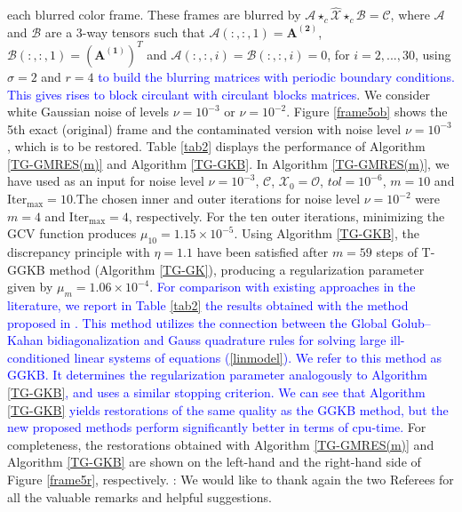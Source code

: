 \documentclass{siamltex}
\newcommand{\1}{\mathbb{1}}
\newcommand{\0}{\mathbb{0}}
\begin{document}
	each blurred color frame. These frames are blurred by $\mathscr {A}\star_c \widehat{\mathscr{X}}\star_c \mathscr{B}= \widehat{\mathscr{C}}$, where  $\mathscr {A}$ and $\mathscr {B}$  are a 3-way tensors such that  $\mathscr {A}(:,:,1)= \mathbf{A^{(2)}}$, $\mathscr {B}(:,:,1)= (\mathbf{A^{(1)}})^T$ and $\mathscr {A}(:,:,i)=\mathscr {B}(:,:,i)=0$, for $i=2,...,30$,  using $\sigma=2$ and $r=4$ \textcolor{blue}{to build the blurring matrices with periodic boundary conditions. This gives rises to block circulant with circulant blocks matrices}. We consider white Gaussian noise of levels $\nu=10^{-3}$ or $\nu=10^{-2}$. Figure \ref{frame5ob} shows the 5th exact (original) frame and the contaminated version with noise level $\nu=10^{-3}$, which is to be restored. Table \ref{tab2} displays the performance of Algorithm \ref{TG-GMRES(m)} and Algorithm \ref{TG-GKB}. In Algorithm \ref{TG-GMRES(m)}, we have used as an input for noise level $\nu=10^{-3}$,  $\mathscr{C}$, $\mathscr{X}_0=\mathscr{O}$, $tol=10^{-6}$, $m=10$ and $\text{Iter}_{\text{max}}=10$.The chosen inner and outer iterations for noise level $\nu=10^{-2}$ were $m=4$ and  $\text{Iter}_{\text{max}}=4$, respectively. For the ten outer iterations,  minimizing the GCV function  produces  $\mu_{10}=1.15 \times 10^{-5}$. Using Algorithm \ref{TG-GKB},  the discrepancy principle with $\eta=1.1$ have been satisfied after $m=59$ steps of  T-GGKB method (Algorithm \ref{TG-GK}), producing a regularization parameter given by $\mu_m=1.06\times10^{-4}$. \textcolor{blue}{For comparison with existing approaches in the literature, we report in Table \ref{tab2} the results obtained with the method 
		proposed in \cite{belguide2}. This method utilizes the connection between the
		Global Golub--Kahan bidiagonalization and Gauss quadrature rules for solving large 
		ill-conditioned linear systems of equations (\ref{linmodel}). We refer to this method as
		GGKB. It determines the regularization parameter analogously to Algorithm \ref{TG-GKB}, and uses a similar stopping criterion. We can see that Algorithm \ref{TG-GKB} yields restorations of the same quality as the GGKB method, but the new proposed methods perform significantly better in terms of cpu-time.} For completeness, the restorations obtained with Algorithm \ref{TG-GMRES(m)} and Algorithm \ref{TG-GKB} are shown on the left-hand and the right-hand side of Figure \ref{frame5r}, respectively.
:  
 We would like to thank again the two Referees for all the valuable  remarks and helpful  suggestions. 
	
\end{document}
